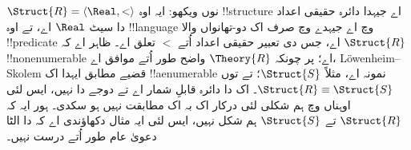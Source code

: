 \documentclass[../../../include/open-logic-section]{subfiles}
\begin{document}
\begin{rem}
  $\Struct{R} = \langle\Real, <\rangle$ نوں ویکھو: ایہ اوہ
  !!{structure} اے جیہدا دائرہ حقیقی اعداد دا سیٹ $\Real$ اے،
  تے اوہ !!{language} وچ اے جیہدے وچ صرف اک دو-تھانواں والا
  !!{predicate} اے، جس دی تعبیر حقیقی اعداد اُتے $<$ تعلق اے۔
  ظاہر اے کہ $\Struct{R}$ !!{nonenumerable} اے؛ پر چونکہ
  $\Theory{R}$ واضح طور اُتے موافق اے، L\"owenheim--Skolem قضیے
  مطابق ایہدا اک !!a{enumerable} نمونہ اے، مثلاً $\Struct{S}$؛
  تے  توں $\Struct{R}
  \equiv \Struct{S}$۔ اک دا دائرہ قابلِ شمار اے تے دوجے دا نہیں،
  ایس لئی اوہناں وچ ہم شکلی لئی درکار اک بہ اک مطابقت نہیں ہو سکدی۔
  ہور ایہ کہ $\Struct{R}$ تے $\Struct{S}$
  ہم شکل نہیں، ایس لئی ایہ مثال دکھاؤندی اے کہ
   دا الٹا دعویٰ عام طور اُتے درست نہیں۔
\end{rem}
\end{document}
